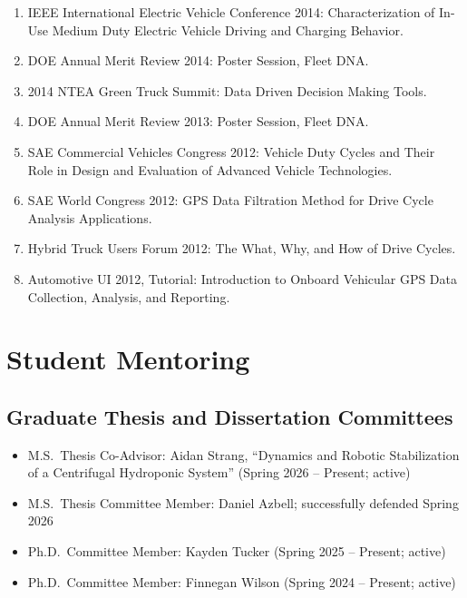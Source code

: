 \documentclass[11pt,letterpaper]{article}
\begin{document}
\begin{enumerate}
  \item IEEE International Electric Vehicle Conference 2014: Characterization of
        In-Use Medium Duty Electric Vehicle Driving and Charging Behavior.

  \item DOE Annual Merit Review 2014: Poster Session, Fleet DNA.

  \item 2014 NTEA Green Truck Summit: Data Driven Decision Making Tools.

  \item DOE Annual Merit Review 2013: Poster Session, Fleet DNA.

  \item SAE Commercial Vehicles Congress 2012: Vehicle Duty Cycles and Their Role in
        Design and Evaluation of Advanced Vehicle Technologies.

  \item SAE World Congress 2012: GPS Data Filtration Method for Drive Cycle Analysis
        Applications.

  \item Hybrid Truck Users Forum 2012: The What, Why, and How of Drive Cycles.

  \item Automotive UI 2012, Tutorial: Introduction to Onboard Vehicular GPS Data
        Collection, Analysis, and Reporting.
\end{enumerate}

\section{Student Mentoring}

\subsection{Graduate Thesis and Dissertation Committees}

\begin{itemize}
  \item M.S.\ Thesis Co-Advisor: Aidan Strang, ``Dynamics and Robotic Stabilization
        of a Centrifugal Hydroponic System'' (Spring 2026 -- Present; active)
  \item M.S.\ Thesis Committee Member: Daniel Azbell; successfully defended Spring 2026
  \item Ph.D.\ Committee Member: Kayden Tucker (Spring 2025 -- Present; active)
  \item Ph.D.\ Committee Member: Finnegan Wilson (Spring 2024 -- Present; active)
\end{itemize}
\end{document}
